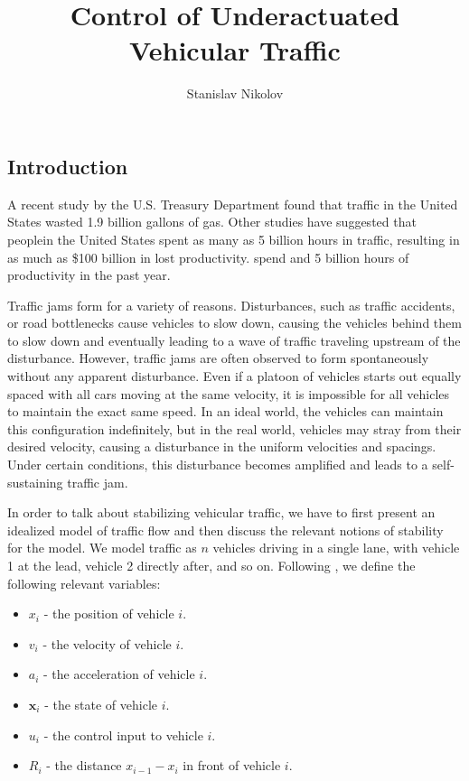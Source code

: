 \documentclass[11pt]{article}
\title{\bf Control of Underactuated Vehicular Traffic}
\author{Stanislav Nikolov}
\newcommand{\mb}{\mathbf}
\begin{document}
\maketitle

\begin{multicols}{2}


\section{Introduction}
A recent study by the U.S. Treasury Department found that traffic in the United States wasted 1.9 billion gallons of gas. Other studies have suggested that peoplein the United States spent as many as 5 billion hours in traffic, resulting in as much as \$100 billion in lost productivity.  spend and 5 billion hours of productivity in the past year.

Traffic jams form for a variety of reasons. Disturbances, such as traffic accidents, or road bottlenecks cause vehicles to slow down, causing the vehicles behind them to slow down and eventually leading to a wave of traffic traveling upstream of the disturbance. However, traffic jams are often observed to form spontaneously without any apparent disturbance. Even if a platoon of vehicles starts out equally spaced with all cars moving at the same velocity, it is impossible for all vehicles to maintain the exact same speed. In an ideal world, the vehicles can maintain this configuration indefinitely, but in the real world, vehicles may stray from their desired velocity, causing a disturbance in the uniform velocities and spacings. Under certain conditions, this disturbance becomes amplified and leads to a self-sustaining traffic jam. %

In order to talk about stabilizing vehicular traffic, we have to first present an idealized model of traffic flow and then discuss the relevant notions of stability for the model. We model traffic as $n$ vehicles driving in a single lane, with vehicle 1 at the lead, vehicle 2 directly after, and so on. Following \cite{Peng}, we define the following relevant variables:

\begin{itemize}
\item $x_i$ - the position of vehicle $i$.
\item $v_i$ - the velocity of vehicle $i$.
\item $a_i$ - the acceleration of vehicle $i$.
\item $\mb x_i$ - the state of vehicle $i$.
\item $u_i$ - the control input to vehicle $i$.
\item $R_i$ - the distance $x_{i-1} - x_i$ in front of vehicle $i$.
\end{itemize}


\end{multicols}
\end{document}
